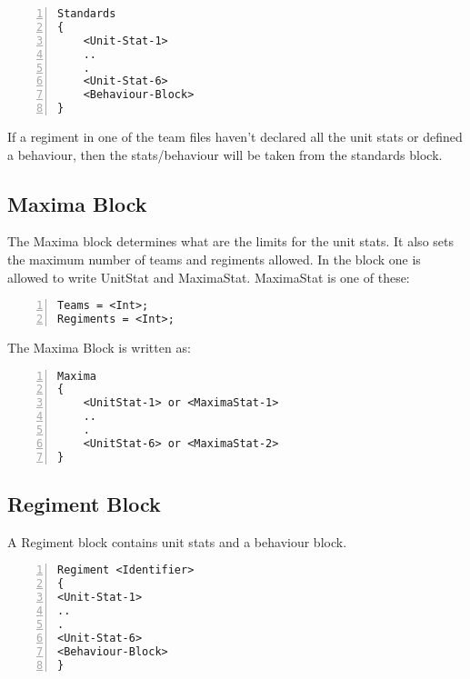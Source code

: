 		\begin{lstlisting}[basicstyle=\small\sffamily,
		keywordstyle={\color{blue}},
		comment={[l]{//}}, morecomment={[s]{/*}{*/}}, commentstyle=\itshape,
		columns={[l]flexible}, numbers=left, numberstyle=\tiny,
		frameround=fftt, frame=shadowbox, captionpos=b,
		caption={Regiment Assignment},
		label=RegimentAssignment]
Standards
{
	<Unit-Stat-1>
	..
	.
	<Unit-Stat-6>
	<Behaviour-Block>
}
		\end{lstlisting}
		If a regiment in one of the team files haven't declared all the unit stats
		or defined a behaviour, then the stats/behaviour will be taken from the standards block.
	\subsection{Maxima Block}
		The Maxima block determines what are the limits for the unit stats. It also sets the maximum number of teams and regiments allowed.
		In the block one is allowed to write UnitStat and MaximaStat.
		MaximaStat is one of these:\\

		\begin{lstlisting}[basicstyle=\small\sffamily,
		keywordstyle={\color{blue}},
		comment={[l]{//}}, morecomment={[s]{/*}{*/}}, commentstyle=\itshape,
		columns={[l]flexible}, numbers=left, numberstyle=\tiny,
		frameround=fftt, frame=shadowbox, captionpos=b,
		caption={Regiment Assignment},
		label=RegimentAssignment]
Teams = <Int>;
Regiments = <Int>;
		\end{lstlisting}
		The Maxima Block is written as: \\

		\begin{lstlisting}[basicstyle=\small\sffamily,
		keywordstyle={\color{blue}},
		comment={[l]{//}}, morecomment={[s]{/*}{*/}}, commentstyle=\itshape,
		columns={[l]flexible}, numbers=left, numberstyle=\tiny,
		frameround=fftt, frame=shadowbox, captionpos=b,
		caption={Regiment Assignment},
		label=RegimentAssignment]
Maxima
{
	<UnitStat-1> or <MaximaStat-1>
	..
	.
	<UnitStat-6> or <MaximaStat-2>
}
		\end{lstlisting}
	\subsection{Regiment Block}
		A Regiment block contains unit stats and a behaviour block.

		\begin{lstlisting}[basicstyle=\small\sffamily,
		keywordstyle={\color{blue}},
		comment={[l]{//}}, morecomment={[s]{/*}{*/}}, commentstyle=\itshape,
		columns={[l]flexible}, numbers=left, numberstyle=\tiny,
		frameround=fftt, frame=shadowbox, captionpos=b,
		caption={Regiment Assignment},
		label=RegimentAssignment]
Regiment <Identifier>
{
<Unit-Stat-1>
..
.
<Unit-Stat-6>
<Behaviour-Block>
}
		\end{lstlisting}
